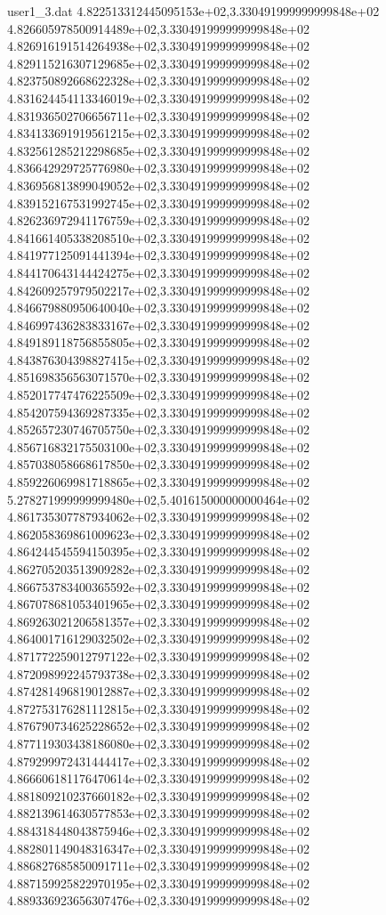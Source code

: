 \begin{filecontents}{user1_3.dat}
4.822513312445095153e+02,3.330491999999999848e+02
4.826605978500914489e+02,3.330491999999999848e+02
4.826916191514264938e+02,3.330491999999999848e+02
4.829115216307129685e+02,3.330491999999999848e+02
4.823750892668622328e+02,3.330491999999999848e+02
4.831624454113346019e+02,3.330491999999999848e+02
4.831936502706656711e+02,3.330491999999999848e+02
4.834133691919561215e+02,3.330491999999999848e+02
4.832561285212298685e+02,3.330491999999999848e+02
4.836642929725776980e+02,3.330491999999999848e+02
4.836956813899049052e+02,3.330491999999999848e+02
4.839152167531992745e+02,3.330491999999999848e+02
4.826236972941176759e+02,3.330491999999999848e+02
4.841661405338208510e+02,3.330491999999999848e+02
4.841977125091441394e+02,3.330491999999999848e+02
4.844170643144424275e+02,3.330491999999999848e+02
4.842609257979502217e+02,3.330491999999999848e+02
4.846679880950640040e+02,3.330491999999999848e+02
4.846997436283833167e+02,3.330491999999999848e+02
4.849189118756855805e+02,3.330491999999999848e+02
4.843876304398827415e+02,3.330491999999999848e+02
4.851698356563071570e+02,3.330491999999999848e+02
4.852017747476225509e+02,3.330491999999999848e+02
4.854207594369287335e+02,3.330491999999999848e+02
4.852657230746705750e+02,3.330491999999999848e+02
4.856716832175503100e+02,3.330491999999999848e+02
4.857038058668617850e+02,3.330491999999999848e+02
4.859226069981718865e+02,3.330491999999999848e+02
5.278271999999999480e+02,5.401615000000000464e+02
4.861735307787934062e+02,3.330491999999999848e+02
4.862058369861009623e+02,3.330491999999999848e+02
4.864244545594150395e+02,3.330491999999999848e+02
4.862705203513909282e+02,3.330491999999999848e+02
4.866753783400365592e+02,3.330491999999999848e+02
4.867078681053401965e+02,3.330491999999999848e+02
4.869263021206581357e+02,3.330491999999999848e+02
4.864001716129032502e+02,3.330491999999999848e+02
4.871772259012797122e+02,3.330491999999999848e+02
4.872098992245793738e+02,3.330491999999999848e+02
4.874281496819012887e+02,3.330491999999999848e+02
4.872753176281112815e+02,3.330491999999999848e+02
4.876790734625228652e+02,3.330491999999999848e+02
4.877119303438186080e+02,3.330491999999999848e+02
4.879299972431444417e+02,3.330491999999999848e+02
4.866606181176470614e+02,3.330491999999999848e+02
4.881809210237660182e+02,3.330491999999999848e+02
4.882139614630577853e+02,3.330491999999999848e+02
4.884318448043875946e+02,3.330491999999999848e+02
4.882801149048316347e+02,3.330491999999999848e+02
4.886827685850091711e+02,3.330491999999999848e+02
4.887159925822970195e+02,3.330491999999999848e+02
4.889336923656307476e+02,3.330491999999999848e+02

\end{filecontents}
